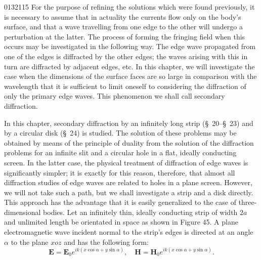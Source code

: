 \begin{scanpage}{0132}{115}
For the purpose of refining the solutions which were found previously, it is necessary to assume that in actuality the currents flow only on the body's surface, and that a wave travelling from one edge to the other will undergo a perturbation at the latter. The process of forming the fringing field when this occurs may be investigated in the following way. The edge wave propagated from one of the edges is diffracted by the other edges; the waves arising with this in turn are diffracted by adjacent edges, etc. In this chapter, we will investigate the case when the dimensions of the surface faces are so large in comparison with the wavelength that it is sufficient to limit oneself to considering the diffraction of only the primary edge waves. This phenomenon we shall call secondary diffraction.

In this chapter, secondary diffraction by an infinitely long strip (\S\ 20--\S\ 23) and by a circular disk (\S\ 24) is studied. The solution of these problems may be obtained by means of the principle of duality from the solution of the diffraction problems for an infinite slit and a circular hole in a flat, ideally conducting screen. In the latter case, the physical treatment of diffraction of edge waves is significantly simpler; it is exactly for this reason, therefore, that almost all diffraction studies of edge waves are related to holes in a plane screen. However, we will not take such a path, but we shall investigate a strip and a disk directly. This approach has the advantage that it is easily generalized to the case of three-dimensional bodies.
Let an infinitely thin, ideally conducting strip of width $2a$ and unlimited length be orientated in space as shown in Figure 45. A plane electromagnetic wave incident normal to the strip's edges is directed at an angle $\alpha$ to the plane $xoz$ and has the following form:
\[\mathbf E=\mathbf E_0e^{ik(x\cos\alpha+y\sin\alpha)},\quad\mathbf H=\mathbf H_0e^{ik(x\cos\alpha+y\sin\alpha)}.\tag{20.01}\]
\end{scanpage}

